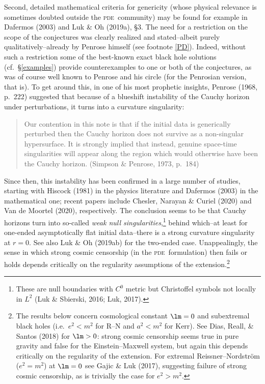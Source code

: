 \documentclass[11pt,a4paper]{article}
\newcommand{\pde}{\textsc{pde}}
\begin{document}
Second, detailed mathematical criteria for genericity (whose physical relevance is sometimes doubted outside the \pde\ community) may be found for example in Dafermos (2003) and 
Luk \& Oh (2019a), \S 3. The need for 
a restriction on the scope of the conjectures was clearly realized and stated--albeit purely qualitatively--already by Penrose himself (see footnote \ref{PD}). 
Indeed,  without such a restriction some of the best-known exact black hole solutions (cf.\ \S\ref{examples})  provide  counterexamples to one or both of the conjectures, as was of course well known to Penrose and his circle (for the Penrosian version, that is).
To get around this,
in one of his most prophetic insights, 
Penrose (1968, p.\ 222) suggested that  because of a blueshift instability of the Cauchy horizon under perturbations,  it  turns into a curvature singularity:
\begin{quote}
\begin{small}
Our contention in this note is that if the initial data is generically perturbed then the Cauchy horizon does not survive as a non-singular hypersurface. It is strongly implied that instead, genuine space-time singularities will appear along the region which would otherwise have been the Cauchy horizon. (Simpson \& Penrose, 1973, p.\ 184)
\end{small}
\end{quote}
Since then, this  instability has  been confirmed in a large number of studies, starting with Hiscock (1981) in the physics literature and  Dafermos (2003) in the  mathematical one; recent papers include Chesler,   Narayan \&  Curiel (2020)  and Van de Moortel (2020), respectively.
 The conclusion seems to be that Cauchy horizons turn into so-called \emph{weak null singularities},\footnote{These are null boundaries with $C^0$  metric  but  Christoffel symbols not locally in $L^2$ (Luk \& Sbierski, 2016; Luk, 2017).}
  behind which--at least for one-ended asymptotically flat initial data--there is a strong curvature singularity at $r=0$. See also Luk \& Oh (2019ab) for the two-ended case. Unappealingly,
  the sense in which strong cosmic censorship (in the \pde\ formulation) then fails or holds depends critically on the regularity assumptions of the extension.\footnote{The results below concern cosmological constant  $\lm=0$ and subextremal black holes (i.e.\ $e^2<m^2$ for R--N and $a^2<m^2$ for Kerr). 
  See Dias, Reall, \& Santos (2018) for   $\lm>0$:  strong cosmic censorship seems true in pure gravity and false for the Einstein--Maxwell system, but again this  depends critically on the regularity of the extension. For extremal Reissner--Nordstr\"{o}m ($e^2=m^2$) at $\lm=0$ see Gajic \& Luk (2017), suggesting failure of strong cosmic censorship, as is trivially the case for $e^2>m^2$.} 
  
\end{document}
